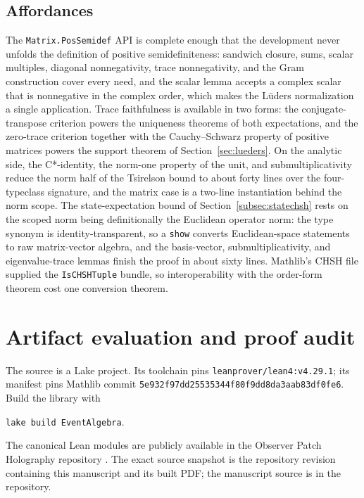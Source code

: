 \documentclass[11pt]{article}
\renewcommand{\_}{\textunderscore\allowbreak}
\theoremstyle{remark}
\begin{document}
\subsection{Affordances}

The \texttt{Matrix.PosSemidef} API is complete enough that the development
never unfolds the definition of positive semidefiniteness: sandwich closure,
sums, scalar multiples, diagonal nonnegativity, trace nonnegativity, and the
Gram construction cover every need, and the scalar lemma accepts a complex
scalar that is nonnegative in the complex order, which makes the L\"uders
normalization a single application. Trace faithfulness is available in two
forms: the conjugate-transpose criterion powers the uniqueness theorems of
both expectations, and the zero-trace criterion together with the
Cauchy--Schwarz property of positive matrices powers the support theorem of
Section~\ref{sec:lueders}. On the analytic side, the C*-identity, the
norm-one property of the unit, and submultiplicativity reduce the norm half
of the Tsirelson bound to about forty lines over the four-typeclass
signature, and the matrix case is a two-line instantiation behind the norm
scope. The state-expectation bound of Section~\ref{subsec:statechsh} rests
on the scoped norm being definitionally the Euclidean operator norm: the
type synonym is identity-transparent, so a \texttt{show} converts
Euclidean-space statements to raw matrix-vector algebra, and the
basis-vector, submultiplicativity, and eigenvalue-trace lemmas finish the
proof in about sixty lines. Mathlib's CHSH file supplied the
\texttt{IsCHSHTuple} bundle, so interoperability with the order-form theorem
cost one conversion theorem.

\section{Artifact evaluation and proof audit}
\label{sec:evaluation}

The source is a Lake project. Its toolchain pins
\texttt{leanprover/lean4:v4.29.1}; its manifest pins Mathlib commit
\texttt{5e932f97dd25535344f80f9dd8da3aab83df0fe6}. Build the library with
\begin{center}
\texttt{lake build EventAlgebra}.
\end{center}
The canonical Lean modules are publicly available in the Observer Patch
Holography repository \cite{observerPatchHolographyRepo}. The exact source
snapshot is the repository revision containing this manuscript and its built
PDF; the manuscript source is in the repository.
\end{document}
